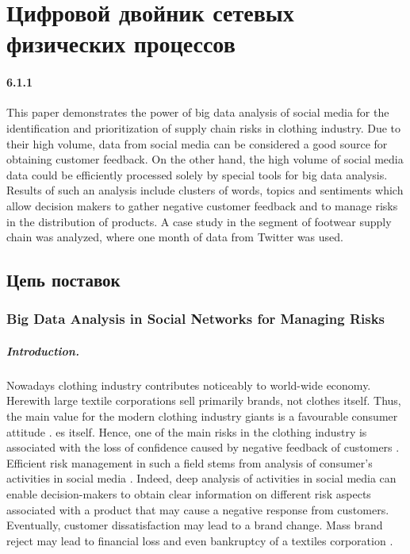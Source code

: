 \chapter{Цифровой двойник сетевых физических процессов}\label{ch:ch6}

\subsubsection{6.1.1}

This paper demonstrates the power of big data analysis of social media for the identification and prioritization of supply chain risks in clothing industry. Due to their high volume, data from social media can be considered a good source for obtaining customer feedback. On the other hand, the high volume of social media data could be efficiently processed solely by special tools for big data analysis. Results of such an analysis include clusters of words, topics and sentiments which allow decision makers to gather negative customer feedback and to manage risks in the distribution of products. A case study in the segment of footwear supply chain was analyzed, where one month of data from Twitter was used.

\section{Цепь поставок}\label{sec:ch6/sect1}

\subsection{Big Data Analysis in Social Networks for Managing Risks}\label{subsec:ch6/sec1/sub1}

\paragraph{Introduction.} Nowadays clothing industry contributes noticeably to world-wide economy. Herewith large textile corporations sell primarily brands, not clothes itself. Thus, the main value for the modern clothing industry giants is a favourable consumer attitude \cite{Choi}. es itself. Hence, one of the main risks in the clothing industry is associated with the loss of confidence caused by negative feedback of customers \cite{IvanovDolguiSokolovIvanova,ChiuChoiDai}. Efficient risk management in such a field stems from analysis of consumer’s activities in social media \cite{Choi}. Indeed, deep analysis of activities in social media can enable decision-makers to obtain clear information on different risk aspects associated with a product that may cause a negative response from customers. Eventually, customer dissatisfaction may lead to a brand change. Mass brand reject may lead to financial loss and even bankruptcy of a textiles corporation \cite{TianChoiDing}.

